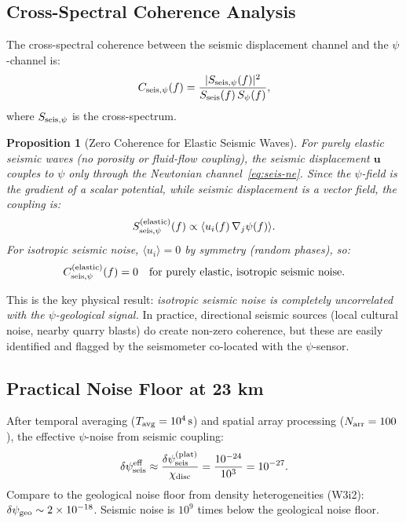 \documentclass[aps,prd,twocolumn,superscriptaddress,nofootinbib]{revtex4-2}
\newtheorem{proposition}[theorem]{Proposition}
\begin{document}
\subsection{Cross-Spectral Coherence Analysis}

The cross-spectral coherence between the seismic displacement channel
and the $\psi$-channel is:
\begin{equation}
  C_{\rm seis,\psi}(f) = \frac{|S_{\rm seis,\psi}(f)|^2}
  {S_{\rm seis}(f)\,S_\psi(f)},
  \label{eq:coherence}
\end{equation}
where $S_{\rm seis,\psi}$ is the cross-spectrum.

\begin{proposition}[Zero Coherence for Elastic Seismic Waves]
\label{prop:zero-coherence}
For purely elastic seismic waves (no porosity or fluid-flow coupling),
the seismic displacement $\mathbf{u}$ couples to $\psi$ only through
the Newtonian channel~\eqref{eq:seis-ne}.  Since the $\psi$-field
is the gradient of a scalar potential, while seismic displacement
is a vector field, the coupling is:
\begin{equation}
  S_{\rm seis,\psi}^{\rm (elastic)}(f)
  \propto \langle u_i(f)\,\nabla_j\psi(f)\rangle.
  \label{eq:cross-spectrum}
\end{equation}
For isotropic seismic noise, $\langle u_i \rangle = 0$ by symmetry
(random phases), so:
\begin{equation}
  C_{\rm seis,\psi}^{\rm (elastic)}(f) = 0
  \quad \text{for purely elastic, isotropic seismic noise.}
  \label{eq:zero-coherence}
\end{equation}
\end{proposition}

This is the key physical result: \emph{isotropic seismic noise is
completely uncorrelated with the $\psi$-geological signal.}  In practice,
directional seismic sources (local cultural noise, nearby quarry blasts)
do create non-zero coherence, but these are easily identified and
flagged by the seismometer co-located with the $\psi$-sensor.

\subsection{Practical Noise Floor at 23 km}

After temporal averaging ($T_{\rm avg} = 10^4\,\mathrm{s}$) and
spatial array processing ($N_{\rm arr} = 100$), the effective
$\psi$-noise from seismic coupling:
\begin{equation}
  \delta\psi_{\rm seis}^{\rm eff} \approx
  \frac{\delta\psi_{\rm seis}^{\rm (plat)}}{\chi_{\rm disc}}
  = \frac{10^{-24}}{10^3} = 10^{-27}.
  \label{eq:seis-eff}
\end{equation}
Compare to the geological noise floor from density heterogeneities
(W3i2): $\delta\psi_{\rm geo} \sim 2\times10^{-18}$.
Seismic noise is $10^9$ times below the geological noise floor.
\end{document}
